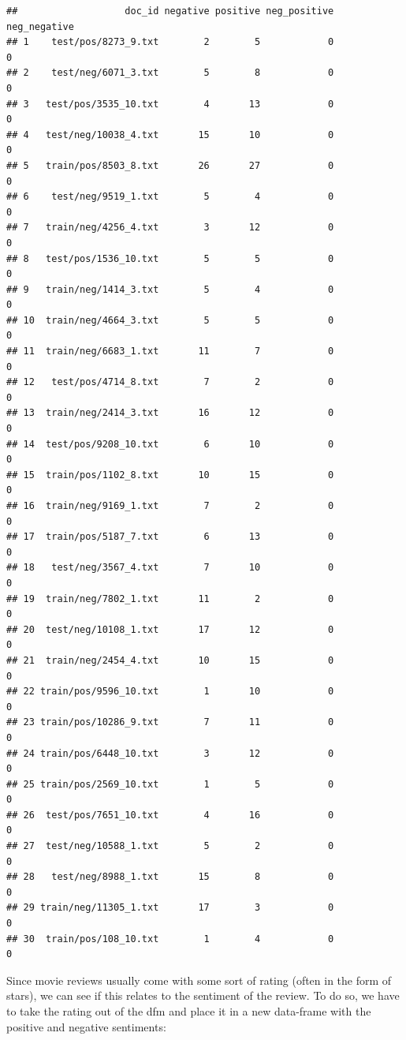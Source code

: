 \documentclass[
]{book}
\begin{document}
\begin{verbatim}
##                   doc_id negative positive neg_positive neg_negative
## 1    test/pos/8273_9.txt        2        5            0            0
## 2    test/neg/6071_3.txt        5        8            0            0
## 3   test/pos/3535_10.txt        4       13            0            0
## 4   test/neg/10038_4.txt       15       10            0            0
## 5   train/pos/8503_8.txt       26       27            0            0
## 6    test/neg/9519_1.txt        5        4            0            0
## 7   train/neg/4256_4.txt        3       12            0            0
## 8   test/pos/1536_10.txt        5        5            0            0
## 9   train/neg/1414_3.txt        5        4            0            0
## 10  train/neg/4664_3.txt        5        5            0            0
## 11  train/neg/6683_1.txt       11        7            0            0
## 12   test/pos/4714_8.txt        7        2            0            0
## 13  train/neg/2414_3.txt       16       12            0            0
## 14  test/pos/9208_10.txt        6       10            0            0
## 15  train/pos/1102_8.txt       10       15            0            0
## 16  train/neg/9169_1.txt        7        2            0            0
## 17  train/pos/5187_7.txt        6       13            0            0
## 18   test/neg/3567_4.txt        7       10            0            0
## 19  train/neg/7802_1.txt       11        2            0            0
## 20  test/neg/10108_1.txt       17       12            0            0
## 21  train/neg/2454_4.txt       10       15            0            0
## 22 train/pos/9596_10.txt        1       10            0            0
## 23 train/pos/10286_9.txt        7       11            0            0
## 24 train/pos/6448_10.txt        3       12            0            0
## 25 train/pos/2569_10.txt        1        5            0            0
## 26  test/pos/7651_10.txt        4       16            0            0
## 27  test/neg/10588_1.txt        5        2            0            0
## 28   test/neg/8988_1.txt       15        8            0            0
## 29 train/neg/11305_1.txt       17        3            0            0
## 30  train/pos/108_10.txt        1        4            0            0
\end{verbatim}

Since movie reviews usually come with some sort of rating (often in the form of stars), we can see if this relates to the sentiment of the review. To do so, we have to take the rating out of the dfm and place it in a new data-frame with the positive and negative sentiments:
\end{document}
